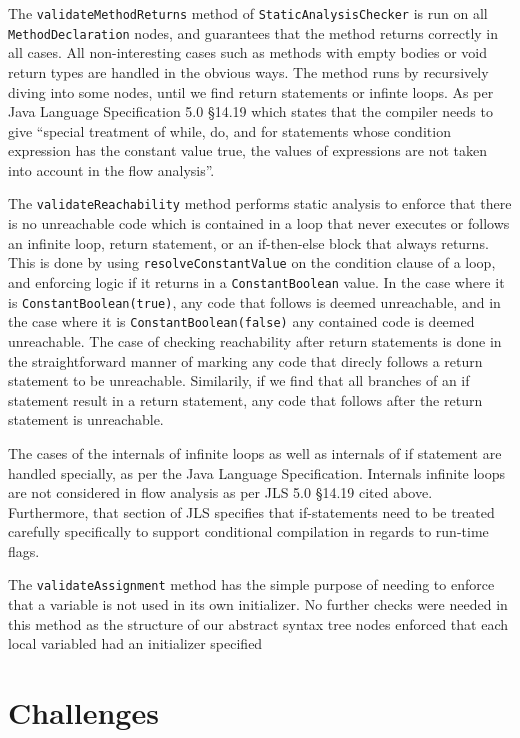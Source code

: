 \documentclass[letterpaper]{article}
\begin{document}
  The {\tt validateMethodReturns} method of {\tt StaticAnalysisChecker} is run
  on all {\tt MethodDeclaration} nodes, and guarantees that the method returns
  correctly in all cases. All non-interesting cases such as methods with empty
  bodies or void return types are handled in the obvious ways. The method runs
  by recursively diving into some nodes, until we find return statements or
  infinte loops. As per Java Language Specification 5.0 \S 14.19 which states
  that the compiler needs to give ``special treatment of while, do, and for
  statements whose condition expression has the constant value true, the values
  of expressions are not taken into account in the flow analysis''.

  The {\tt validateReachability} method performs static analysis to enforce that
  there is no unreachable code which is contained in a loop that never executes
  or follows an infinite loop, return statement, or an if-then-else block that
  always returns. This is done by using {\tt resolveConstantValue} on the
  condition clause of a loop, and enforcing logic if it returns in a
  {\tt ConstantBoolean} value. In the case where it is
  {\tt ConstantBoolean(true)}, any code that follows is deemed unreachable, and
  in the case where it is {\tt ConstantBoolean(false)} any contained code is
  deemed unreachable. The case of checking reachability after return statements
  is done in the straightforward manner of marking any code that direcly follows
  a return statement to be unreachable. Similarily, if we find that all branches
  of an if statement result in a return statement, any code that follows after
  the return statement is unreachable.

  The cases of the internals of infinite loops as well as internals of if
  statement are handled specially, as per the Java Language Specification.
  Internals infinite loops are not considered in flow analysis as per
  JLS 5.0 \S 14.19 cited above. Furthermore, that section of JLS specifies that
  if-statements need to be treated carefully specifically to support conditional
  compilation in regards to run-time flags.

  The {\tt validateAssignment} method has the simple purpose of needing to
  enforce that a variable is not used in its own initializer. No further checks
  were needed in this method as the structure of our abstract syntax tree nodes
  enforced that each local variabled had an initializer specified

  \section{Challenges}
\end{document}
